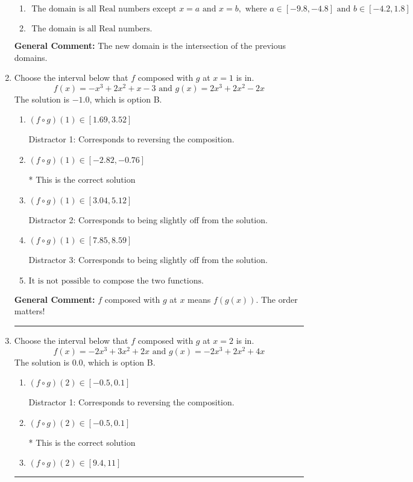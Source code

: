 \documentclass{extbook}[14pt]
\newcommand{\litem}[1]{\item #1

\rule{\textwidth}{0.4pt}}
\begin{document}
\begin{enumerate}
{\begin{enumerate}[label=\Alph*.]
\item \( \text{ The domain is all Real numbers except } x = a \text{ and } x = b, \text{ where } a \in [-9.8, -4.8] \text{ and } b \in [-4.2, 1.8] \)


\item \( \text{ The domain is all Real numbers. } \)


\end{enumerate}

\textbf{General Comment:} The new domain is the intersection of the previous domains.
}
\litem{
Choose the interval below that $f$ composed with $g$ at $x=1$ is in.
\[ f(x) = -x^{3} +2 x^{2} +x -3 \text{ and } g(x) = 2x^{3} +2 x^{2} -2 x \]The solution is \( -1.0 \), which is option B.\begin{enumerate}[label=\Alph*.]
\item \( (f \circ g)(1) \in [1.69, 3.52] \)

 Distractor 1: Corresponds to reversing the composition.
\item \( (f \circ g)(1) \in [-2.82, -0.76] \)

* This is the correct solution
\item \( (f \circ g)(1) \in [3.04, 5.12] \)

 Distractor 2: Corresponds to being slightly off from the solution.
\item \( (f \circ g)(1) \in [7.85, 8.59] \)

 Distractor 3: Corresponds to being slightly off from the solution.
\item \( \text{It is not possible to compose the two functions.} \)


\end{enumerate}

\textbf{General Comment:} $f$ composed with $g$ at $x$ means $f(g(x))$. The order matters!
}
\litem{
Choose the interval below that $f$ composed with $g$ at $x=2$ is in.
\[ f(x) = -2x^{3} +3 x^{2} +2 x \text{ and } g(x) = -2x^{3} +2 x^{2} +4 x \]The solution is \( 0.0 \), which is option B.\begin{enumerate}[label=\Alph*.]
\item \( (f \circ g)(2) \in [-0.5, 0.1] \)

 Distractor 1: Corresponds to reversing the composition.
\item \( (f \circ g)(2) \in [-0.5, 0.1] \)

* This is the correct solution
\item \( (f \circ g)(2) \in [9.4, 11] \)


\end{enumerate}}
\end{enumerate}
\end{document}
